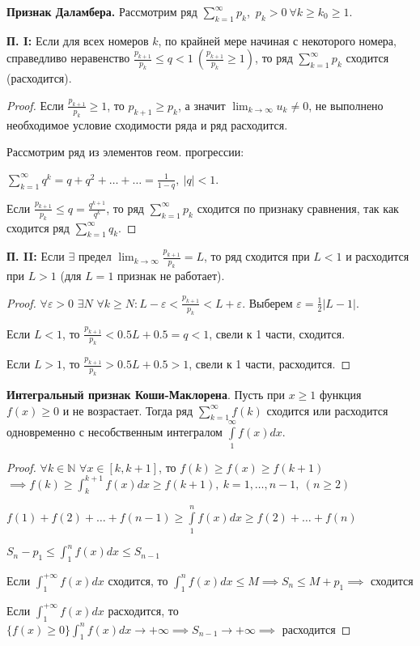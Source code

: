 \bigbreak
\textbf{Признак Даламбера.}
Рассмотрим ряд $\displaystyle \sum_{k=1}^{\infty}p_k$,~$p_k > 0~\forall k \geqslant k_0 \geqslant 1$.

\textbf{П. I:} Если для всех номеров $k$, по крайней мере начиная с некоторого номера, справедливо неравенство
$\frac{p_{k+1}}{p_k} \leqslant q < 1 ~ \left( \frac{p_{k+1}}{p_k} \geqslant 1 \right)$,
то ряд $\displaystyle \sum_{k=1}^{\infty}p_k$ сходится (расходится).
    
\begin{proof}
Если $\frac{p_{k+1}}{p_k} \geqslant 1$, то $p_{k+1} \geqslant p_k$, а значит $\lim_{k\rightarrow\infty} u_k \neq 0$,
не выполнено необходимое условие сходимости ряда и ряд расходится.

Рассмотрим ряд из элементов геом. прогрессии: 

$\sum_{k=1}^{\infty} q^k = q + q^2 + \dots + \dots = \frac{1}{1-q}, \ |q| < 1$.

Если $\frac{p_{k+1}}{p_k} \leqslant q = \frac{q^{k+1}}{q^k}$, то ряд $\displaystyle \sum_{k=1}^{\infty}p_k$ сходится по признаку сравнения,
так как сходится ряд $\displaystyle \sum_{k=1}^{\infty}q_k$.
\end{proof}

\textbf{П. II:} Если $\exists$ предел $\displaystyle\lim_{k\rightarrow\infty}\frac{p_{k+1}}{p_k} = L$,
то ряд сходится при $L < 1$ и расходится при $L > 1$ (для $L=1$ признак не работает).


\begin{proof}
$\forall \varepsilon > 0$ $\exists N$ $\forall k \geq N : L - \varepsilon < \frac{p_{k+1}}{p_k} < L + \varepsilon$.
Выберем $\varepsilon = \frac{1}{2} |L-1|$.

Если $L < 1$, то $\frac{p_{k+1}}{p_k} < 0.5L + 0.5 = q < 1$, свели к 1 части, сходится.

Если $L > 1$, то $\frac{p_{k+1}}{p_k} > 0.5L + 0.5 > 1$, свели к 1 части, расходится.
\end{proof}

\bigbreak
\textbf{Интегральный признак Коши-Маклорена}.
Пусть при $x \geqslant 1$ функция $f(x) \geq 0$ и не возрастает.
Тогда ряд $\displaystyle \sum_{k=1}^{\infty}f(k)$ сходится или расходится одновременно с несобственным интегралом
$\int\limits_{1}^{\infty}f(x)dx$.

\begin{proof}
$\forall k \in \mathbb{N}$ $\forall x \in [k, k + 1]$, то $f(k) \geq f(x) \geq f(k+1) $
$\implies f(k) \geq \int_k^{k+1}f(x)dx \geq f(k+1), ~ k = 1, \dots, n-1, ~ (n \geq 2)$

$f(1) + f(2) + \dots + f(n-1) \geq \int\limits_1^n f(x)dx \geq f(2) + \dots + f(n)$

$S_n - p_1 \leq \int_1^n f(x)dx \leq S_{n-1}$

Если $\int_1^{+\infty} f(x)dx$ сходится, то $\int_1^n f(x)dx \leq M \implies S_n \leq M + p_1 \implies$ сходится 

Если $\int_1^{+\infty} f(x)dx$ расходится, то $\{f(x) \geq 0\} \int_1^n f(x)dx \rightarrow +\infty \implies S_{n-1} \rightarrow +\infty \implies$ расходится
\end{proof}


